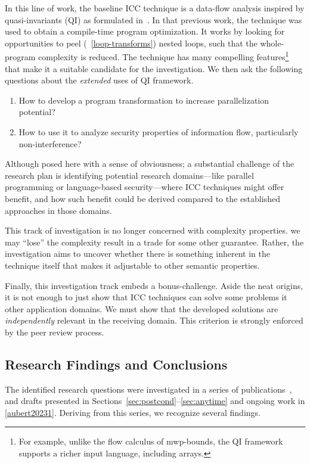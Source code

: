 In this line of work, the baseline ICC technique is a data-flow analysis inspired by quasi-invariants (QI) as formulated in~\textcite{moyen20172}.
In that previous work, the technique was used to obtain a compile-time program optimization.
It works by looking for opportunities to peel (\cf~\autoref{loop-transforms}) nested loops, such that the whole-program complexity is reduced.
The technique has many compelling features\footnote{For example, unlike the flow calculus of mwp-bounds, the QI framework supports a richer input language, including arrays.} that make it a suitable candidate for the investigation.
We then ask the following questions about the \emph{extended} uses of QI framework.
\begin{enumerate}
\item How to develop a program transformation to increase parallelization potential?
\item How to use it to analyze security properties of information flow, particularly non-interference?
\end{enumerate}
Although posed here with a sense of obviousness;
a substantial challenge of the research plan is {identifying} potential research domains---like parallel programming or language-based security---where ICC techniques might offer benefit, and how such benefit could be derived compared to the established approaches in those domains.

This track of investigation is no longer concerned with complexity properties.
\Ie we may \enquote{lose} the complexity result in a trade for some other guarantee.
Rather, the investigation aims to uncover whether there is something inherent in the {technique} itself that makes it adjustable to other semantic properties.

Finally, this investigation track embeds a bonus-challenge.
Aside the neat origins, it is not enough to just show that ICC techniques can solve some problems it other application domains.
We must show that the developed solutions are \emph{independently} relevant in the receiving domain.
This criterion is strongly enforced by the peer review process.

\subsection{Research Findings and Conclusions}
\label{subsec:results}

The identified research questions were investigated in a series of publications~\cite{aubert20222,aubert20232,aubert2023b}, and drafts presented in Sections~\ref{sec:postcond}--\ref{sec:anytime} and ongoing work in \autoref{aubert20231}.
Deriving from this series, we recognize several findings.

